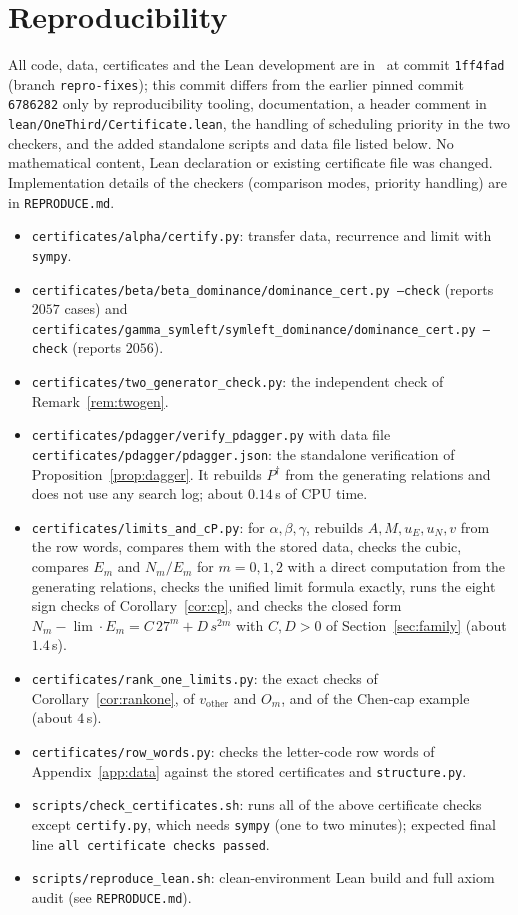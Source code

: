 \documentclass[11pt]{amsart}
\theoremstyle{definition}
\theoremstyle{remark}
\newcommand{\pin}{1ff4fad}
\begin{document}
\section{Reproducibility}\label{app:repro}
All code, data, certificates and the Lean development are in~\cite{repo} at commit \texttt{\pin} (branch \texttt{repro-fixes}); this commit differs from the earlier pinned commit \texttt{6786282} only by reproducibility tooling, documentation, a header comment in \texttt{lean/OneThird/Certificate.lean}, the handling of scheduling priority in the two checkers, and the added standalone scripts and data file listed below. No mathematical content, Lean declaration or existing certificate file was changed. Implementation details of the checkers (comparison modes, priority handling) are in \texttt{REPRODUCE.md}.
\begin{itemize}
  \item \texttt{certificates/alpha/certify.py}: transfer data, recurrence and limit with \texttt{sympy}.
  \item \texttt{certificates/beta/beta\_dominance/dominance\_cert.py --check} (reports $2057$ cases) and \texttt{certificates/gamma\_symleft/symleft\_dominance/dominance\_cert.py --check} (reports $2056$).
  \item \texttt{certificates/two\_generator\_check.py}: the independent check of Remark~\ref{rem:twogen}.
  \item \texttt{certificates/pdagger/verify\_pdagger.py} with data file \texttt{certificates/pdagger/pdagger.json}: the standalone verification of Proposition~\ref{prop:dagger}. It rebuilds $P^\dagger$ from the generating relations and does not use any search log; about $0.14$\,s of CPU time.
  \item \texttt{certificates/limits\_and\_cP.py}: for $\alpha,\beta,\gamma$, rebuilds $A,M,u_E,u_N,v$ from the row words, compares them with the stored data, checks the cubic, compares $E_m$ and $N_m/E_m$ for $m=0,1,2$ with a direct computation from the generating relations, checks the unified limit formula exactly, runs the eight sign checks of Corollary~\ref{cor:cp}, and checks the closed form $N_m-\lim\cdot E_m=C\,27^m+D\,s^{2m}$ with $C,D>0$ of Section~\ref{sec:family} (about $1.4$\,s).
  \item \texttt{certificates/rank\_one\_limits.py}: the exact checks of Corollary~\ref{cor:rankone}, of $v_{\mathrm{other}}$ and $O_m$, and of the Chen-cap example (about $4$\,s).
  \item \texttt{certificates/row\_words.py}: checks the letter-code row words of Appendix~\ref{app:data} against the stored certificates and \texttt{structure.py}.
  \item \texttt{scripts/check\_certificates.sh}: runs all of the above certificate checks except \texttt{certify.py}, which needs \texttt{sympy} (one to two minutes); expected final line \texttt{all certificate checks passed}.
  \item \texttt{scripts/reproduce\_lean.sh}: clean-environment Lean build and full axiom audit (see \texttt{REPRODUCE.md}).
\end{itemize}
\end{document}
